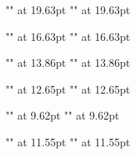 {      %
      \font\titlemczzz"\txijamcfont" at 19.63pt
      \font\titlegtzzz"\txijagtfont" at 19.63pt
      \def\titlemc{\setjafont\titlemczzz}
      \def\titlegt{\setjafont\titlegtzzz}

      \font\chapmczzz"\txijamcfont" at 16.63pt
      \font\chapgtzzz"\txijagtfont" at 16.63pt
      \def\chapmc{\setjafont\chapmczzz}
      \def\chapgt{\setjafont\chapgtzzz}

      \font\secmczzz"\txijamcfont" at 13.86pt
      \font\secgtzzz"\txijagtfont" at 13.86pt
      \def\secmc{\setjafont\secmczzz}
      \def\secgt{\setjafont\secgtzzz}

      \font\ssecmczzz"\txijamcfont" at 12.65pt
      \font\ssecgtzzz"\txijagtfont" at 12.65pt
      \def\ssecmc{\setjafont\ssecmczzz}
      \def\ssecgt{\setjafont\ssecgtzzz}

      \font\reducedmczzz"\txijamcfont" at 9.62pt
      \font\reducedgtzzz"\txijagtfont" at 9.62pt
      \def\reducedmc{\setjafont\reducedmczzz}
      \def\reducedgt{\setjafont\reducedgtzzz}

      \font\shortcontmczzz"\txijamcfont" at 11.55pt
      \font\shortcontgtzzz"\txijagtfont" at 11.55pt
      \def\shortcontmc{\setjafont\shortcontmczzz}
      \def\shortcontgt{\setjafont\shortcontgtzzz}

    }


